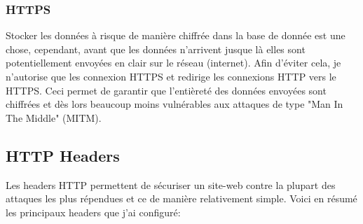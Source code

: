 \subsubsection{HTTPS}
Stocker les données à risque de manière chiffrée dans la base de donnée est une chose, cependant, avant que les données n'arrivent jusque là elles sont potentiellement envoyées en clair sur le réseau (internet). Afin d'éviter cela, je n'autorise que les connexion HTTPS et redirige les connexions HTTP vers le HTTPS. Ceci permet de garantir que l'entièreté des données envoyées sont chiffrées et dès lors beaucoup moins vulnérables aux attaques de type "Man In The Middle" (MITM).

\newpage

\subsection{HTTP Headers}

Les headers HTTP permettent de sécuriser un site-web contre la plupart des attaques les plus répendues et ce de manière relativement simple. Voici en résumé les principaux headers que j'ai configuré:

